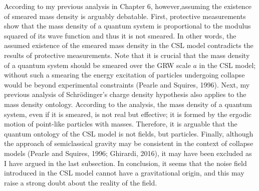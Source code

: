 According to my previous analysis in Chapter 6, however,assuming the existence of smeared mass density is arguably debatable.
First, protective measurements show that the mass density of a quantum system is proportional to the modulus squared of its wave function and thus it is not smeared. In other words,  the assumed existence of the smeared mass density in the CSL model contradicts the results of protective measurements.
Note that it is crucial that the mass density of a quantum system should be smeared over the  GRW scale $a$ in the CSL model; without such a smearing the energy excitation of particles undergoing collapse would be beyond experimental constraints (Pearle and Squires, 1996).
Next, my previous analysis of Schr\"{o}dinger's charge density hypothesis also applies to the mass density ontology.
According to the analysis, the mass density of a quantum system, even if it is smeared, is not real but effective; it is formed by the ergodic motion of point-like particles with masses.
Therefore, it is arguable that the quantum ontology of the CSL model is not fields, but particles.
Finally, although the approach of semiclassical gravity may be consistent in the context of collapse models (Pearle and Squires, 1996; Ghirardi, 2016), it may have been excluded as I have argued in the last subsection. %
In conclusion, it seems that the noise field introduced in the CSL model cannot have a gravitational origin, and this may raise a strong doubt about the reality of the field.

